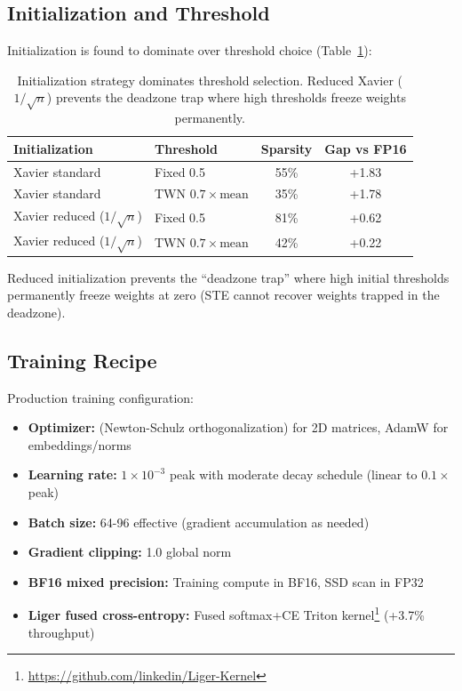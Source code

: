 \documentclass{article}
\begin{document}
\subsection{Initialization and Threshold}

Initialization is found to dominate over threshold choice (Table~\ref{tab:init_threshold}):

\begin{table}[t]
\centering
\small
\caption{Initialization strategy dominates threshold selection. Reduced Xavier ($1/\sqrt{n}$) prevents the deadzone trap where high thresholds freeze weights permanently.}
\label{tab:init_threshold}
\begin{tabular}{llcc}
\toprule
\textbf{Initialization} & \textbf{Threshold} & \textbf{Sparsity} & \textbf{Gap vs FP16} \\
\midrule
Xavier standard & Fixed 0.5 & 55\% & +1.83 \\
Xavier standard & TWN $0.7 \times \text{mean}$ & 35\% & +1.78 \\
Xavier reduced ($1/\sqrt{n}$) & Fixed 0.5 & 81\% & +0.62 \\
Xavier reduced ($1/\sqrt{n}$) & TWN $0.7 \times \text{mean}$ & 42\% & +0.22 \\
\bottomrule
\end{tabular}
\end{table}

Reduced initialization prevents the ``deadzone trap'' where high initial thresholds permanently freeze weights at zero (STE cannot recover weights trapped in the deadzone).

\subsection{Training Recipe}

Production training configuration:
\begin{itemize}
    \item \textbf{Optimizer:} \citet{jordan2024muon} (Newton-Schulz orthogonalization) for 2D matrices, AdamW for embeddings/norms
    \item \textbf{Learning rate:} $1 \times 10^{-3}$ peak with moderate decay schedule (linear to $0.1 \times$ peak)
    \item \textbf{Batch size:} 64-96 effective (gradient accumulation as needed)
    \item \textbf{Gradient clipping:} 1.0 global norm
    \item \textbf{BF16 mixed precision:} Training compute in BF16, SSD scan in FP32
    \item \textbf{Liger fused cross-entropy:} Fused softmax+CE Triton kernel\footnote{\url{https://github.com/linkedin/Liger-Kernel}} (+3.7\% throughput)
\end{itemize}
\end{document}
